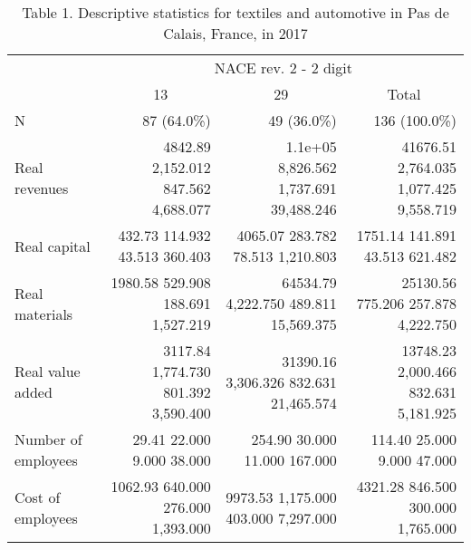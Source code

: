 \documentclass{article}
\begin{document}
\begin{table}[!h]
\caption{Table 1. Descriptive statistics for textiles and automotive in Pas de Calais, France, in 2017}
\centering
\begin{tabular}{llll}
\cline{1-4}
\multicolumn{1}{r}{} &
  \multicolumn{3}{c}{NACE rev. 2 - 2 digit} \\
\multicolumn{1}{r}{} &
  \multicolumn{1}{c}{13} &
  \multicolumn{1}{c}{29} &
  \multicolumn{1}{c}{Total} \\
\cline{1-4}
\multicolumn{1}{l}{N} &
  \multicolumn{1}{r}{87 (64.0\%)} &
  \multicolumn{1}{r}{49 (36.0\%)} &
  \multicolumn{1}{r}{136 (100.0\%)} \\
\multicolumn{1}{l}{Real revenues} &
  \multicolumn{1}{r}{4842.89 2,152.012 847.562 4,688.077} &
  \multicolumn{1}{r}{1.1e+05 8,826.562 1,737.691 39,488.246} &
  \multicolumn{1}{r}{41676.51 2,764.035 1,077.425 9,558.719} \\
\multicolumn{1}{l}{Real capital} &
  \multicolumn{1}{r}{432.73 114.932 43.513 360.403} &
  \multicolumn{1}{r}{4065.07 283.782 78.513 1,210.803} &
  \multicolumn{1}{r}{1751.14 141.891 43.513 621.482} \\
\multicolumn{1}{l}{Real materials} &
  \multicolumn{1}{r}{1980.58 529.908 188.691 1,527.219} &
  \multicolumn{1}{r}{64534.79 4,222.750 489.811 15,569.375} &
  \multicolumn{1}{r}{25130.56 775.206 257.878 4,222.750} \\
\multicolumn{1}{l}{Real value added} &
  \multicolumn{1}{r}{3117.84 1,774.730 801.392 3,590.400} &
  \multicolumn{1}{r}{31390.16 3,306.326 832.631 21,465.574} &
  \multicolumn{1}{r}{13748.23 2,000.466 832.631 5,181.925} \\
\multicolumn{1}{l}{Number of employees} &
  \multicolumn{1}{r}{29.41 22.000 9.000 38.000} &
  \multicolumn{1}{r}{254.90 30.000 11.000 167.000} &
  \multicolumn{1}{r}{114.40 25.000 9.000 47.000} \\
\multicolumn{1}{l}{Cost of employees} &
  \multicolumn{1}{r}{1062.93 640.000 276.000 1,393.000} &
  \multicolumn{1}{r}{9973.53 1,175.000 403.000 7,297.000} &
  \multicolumn{1}{r}{4321.28 846.500 300.000 1,765.000} \\
\cline{1-4}
\end{tabular}
\end{table}
\end{document}
